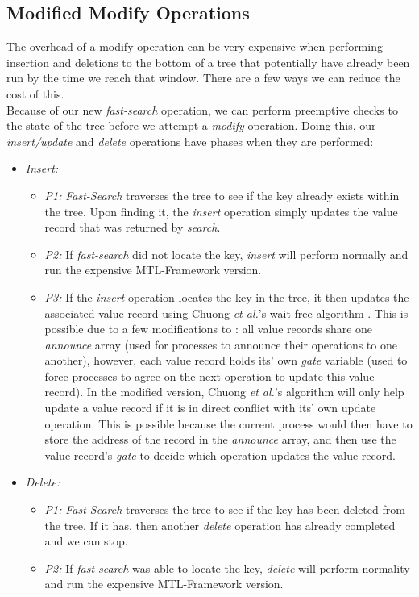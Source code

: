 \documentclass[letterpaper, 10 pt, conference]{ieeeconf}
\begin{document}
	\subsection{Modified Modify Operations}
	The overhead of a modify operation can be very expensive when performing insertion and deletions to the bottom of a tree that potentially have already been run by the time we reach that window. There are a few ways we can reduce the cost of this. \\
	Because of our new \textit{fast-search} operation, we can perform preemptive checks to the state of the tree before we attempt a \textit{modify} operation. Doing this, our \textit{insert/update} and \textit{delete} operations have phases when they are performed:
	\begin{itemize}
		\item \textit{Insert:}
		\begin{itemize}
			\item \textit{P1:} \textit{Fast-Search} traverses the tree to see if the key already exists within the tree. Upon finding it, the \textit{insert} operation simply updates the value record that was returned by \textit{search}.
			\item \textit{P2:} If \textit{fast-search} did not locate the key, \textit{insert} will perform normally and run the expensive MTL-Framework version.
			\item \textit{P3:} If the \textit{insert} operation locates the key in the tree, it then updates the associated value record using Chuong \textit{et al.}'s wait-free algorithm \cite{c8}. This is possible due to a few modifications to \cite{c*}: all value records share one \textit{announce} array (used for processes to announce their operations to one another), however, each value record holds its' own \textit{gate} variable (used to force processes to agree on the next operation to update this value record). In the modified version, Chuong \textit{et al.}'s algorithm will only help update a value record if it is in direct conflict with its' own update operation. This is possible because the current process would then have to store the address of the record in the \textit{announce} array, and then use the value record's \textit{gate} to decide which operation updates the value record. 
		\end{itemize}
		\item \textit{Delete:}
		\begin{itemize}
			\item \textit{P1:} \textit{Fast-Search} traverses the tree to see if the key has been deleted from the tree. If it has, then another \textit{delete} operation has already completed and we can stop.
			\item \textit{P2:} If \textit{fast-search} was able to locate the key, \textit{delete} will perform normality and run the expensive MTL-Framework version.
		\end{itemize} 
	\end{itemize}
\end{document}
